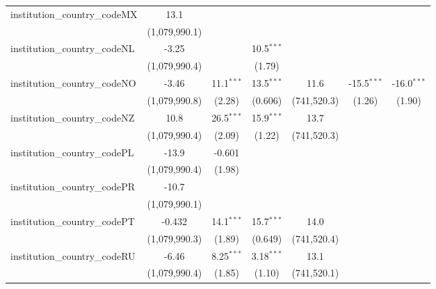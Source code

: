 \begin{tabular}{lcccccc}
   institution\_country\_codeMX          & 13.1          &               &               &               &               &   \\   
                                         & (1,079,990.1) &               &               &               &               &   \\   
   institution\_country\_codeNL          & -3.25         &               & 10.5$^{***}$  &               &               &   \\   
                                         & (1,079,990.4) &               & (1.79)        &               &               &   \\   
   institution\_country\_codeNO          & -3.46         & 11.1$^{***}$  & 13.5$^{***}$  & 11.6          & -15.5$^{***}$ & -16.0$^{***}$\\   
                                         & (1,079,990.8) & (2.28)        & (0.606)       & (741,520.3)   & (1.26)        & (1.90)\\   
   institution\_country\_codeNZ          & 10.8          & 26.5$^{***}$  & 15.9$^{***}$  & 13.7          &               &   \\   
                                         & (1,079,990.4) & (2.09)        & (1.22)        & (741,520.3)   &               &   \\   
   institution\_country\_codePL          & -13.9         & -0.601        &               &               &               &   \\   
                                         & (1,079,990.4) & (1.98)        &               &               &               &   \\   
   institution\_country\_codePR          & -10.7         &               &               &               &               &   \\   
                                         & (1,079,990.1) &               &               &               &               &   \\   
   institution\_country\_codePT          & -0.432        & 14.1$^{***}$  & 15.7$^{***}$  & 14.0          &               &   \\   
                                         & (1,079,990.3) & (1.89)        & (0.649)       & (741,520.4)   &               &   \\   
   institution\_country\_codeRU          & -6.46         & 8.25$^{***}$  & 3.18$^{***}$  & 13.1          &               &   \\   
                                         & (1,079,990.4) & (1.85)        & (1.10)        & (741,520.1)   &               &   \\   

\end{tabular}
